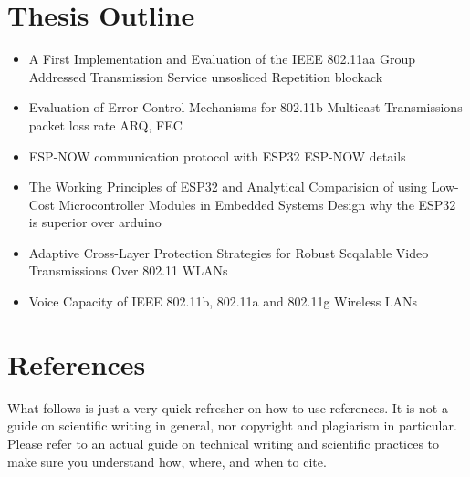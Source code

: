 \documentclass[]{ccs-thesis}
\begin{document}
\section{Thesis Outline}
\begin{itemize}
	\item A First Implementation and Evaluation of the IEEE 802.11aa Group Addressed Transmission Service    
		\subitem unsosliced Repetition
		\subitem blockack
	\item Evaluation of Error Control Mechanisms for 802.11b Multicast Transmissions
		\subitem packet loss rate
		\subitem ARQ, FEC
	\item ESP-NOW communication protocol with ESP32
		\subitem ESP-NOW details
	\item The Working Principles of ESP32 and Analytical Comparision of using Low-Cost Microcontroller Modules in Embedded Systems Design
		\subitem why the ESP32 is superior over arduino
	\item Adaptive Cross-Layer Protection Strategies for Robust Scqalable Video Transmissions Over 802.11 WLANs
	\item Voice Capacity of IEEE 802.11b, 802.11a and 802.11g Wireless LANs
\end{itemize}

\clearpage
\section{References}

What follows is just a very quick refresher on how to use references.
It is not a guide on scientific writing in general, nor copyright and plagiarism in particular.
Please refer to an actual guide on technical writing and scientific practices to make sure you understand how, where, and when to cite.
\end{document}
